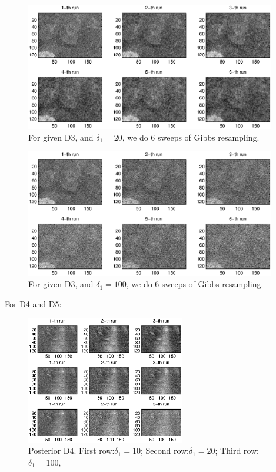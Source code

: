 \documentclass[11pt] {article}
\begin{document}
\begin{figure}
\begin{center}

\includegraphics[height=2.2in]{D3_d2.eps}

\end{center}
\caption{For given D3, and $\delta_1=20$, we do 6 sweeps of Gibbs resampling.}
\label{fig:D3_d2}
\end{figure}

\begin{figure}
\begin{center}

\includegraphics[height=2.2in]{D3_d4.eps}

\end{center}
\caption{For given D3, and $\delta_1=100$, we do 6 sweeps of Gibbs resampling.}
\label{fig:D3_d3}
\end{figure}

For D4 and D5:

\begin{figure}
\begin{center}

\includegraphics[height=2.2in]{D4.eps}

\end{center}
\caption{Posterior D4. First row:$\delta_1=10$; Second row:$\delta_1=20$; Third row:$\delta_1=100$, }
\label{fig:D4}
\end{figure}
\end{document}
